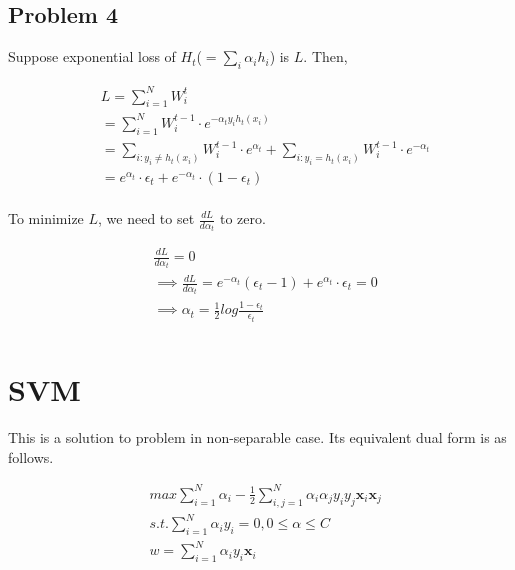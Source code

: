 \documentclass[10pt]{article}
\begin{document}
\subsection{Problem 4}

Suppose exponential loss of $H_t$($=\sum_{i}\alpha_{i}h_i$) is $L$. Then,

\begin{equation}
\begin{aligned}
& L = \sum_{i=1}^{N}W_{i}^{t} \\
& = \sum_{i=1}^{N}W_{i}^{t-1}\cdot e^{-\alpha_{t}y_{i}h_{t}(x_i)} \\
& = \sum_{i:y_{i}\neq h_{t}(x_i)}W_{i}^{t-1}\cdot e^{\alpha_{t}} + \sum_{i:y_{i}= h_{t}(x_i)}W_{i}^{t-1}\cdot e^{-\alpha_{t}} \\
& = e^{\alpha_{t}}\cdot \epsilon_{t} + e^{-\alpha_{t}}\cdot (1- \epsilon_{t}) \\
\end{aligned}
\end{equation}

To minimize $L$, we need to set $\frac{dL}{d\alpha_t}$ to zero.

\begin{equation}
\begin{aligned}
& \frac{dL}{d\alpha_t} = 0 \\
& \implies \frac{dL}{d\alpha_t}= e^{-\alpha_t}(\epsilon_t-1)+e^{\alpha_t}\cdot \epsilon_t = 0 \\
& \implies \alpha_t= \frac{1}{2}log\frac{1-\epsilon_t}{\epsilon_t} \\
\end{aligned}
\end{equation}


\section{SVM}

This is a solution to problem in non-separable case. Its equivalent dual form is as follows.

\begin{equation}
\begin{aligned}
& max{\sum_{i=1}^{N}\alpha_{i}-\frac{1}{2}\sum_{i,j=1}^{N}\alpha_{i}\alpha_{j}y_{i}y_{j}\mathbf{x}_{i}\mathbf{x}_{j}} \\
& s.t. \sum_{i=1}^{N}\alpha_{i}y_{i} = 0, 0\leq \alpha\leq C \\
& w=\sum_{i=1}^{N}\alpha_{i}y_{i}\mathbf{x}_i \\
\end{aligned}
\end{equation}
\end{document}
